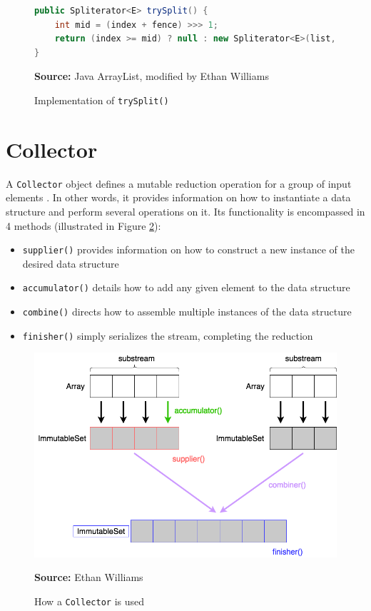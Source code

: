 \documentclass[oneside, 12pt]{article}
\newcommand{\source}[1]{\textbf{Source:} {#1} }
\begin{document}
\begin{figure}[H]
\centering
\begin{lstlisting}[language=Java]
public Spliterator<E> trySplit() {
    int mid = (index + fence) >>> 1;
    return (index >= mid) ? null : new Spliterator<E>(list, index, index = mid);
}
\end{lstlisting}
\caption{Implementation of {\tt trySplit()}}
\source{Java ArrayList, modified by Ethan Williams}
\label{fig:trySplit}
\end{figure}

\section{Collector}
A \verb|Collector| object defines a mutable reduction operation for a group of input elements \autocite{collector_doc}. In other words, it provides information on how to instantiate a data structure and perform several operations on it. Its functionality is encompassed in 4 methods (illustrated in Figure \ref{fig:collector}):

\begin{itemize}
\item \verb|supplier()| provides information on how to construct a new instance of the desired data structure
\item \verb|accumulator()| details how to add any given element to the data structure
\item \verb|combine()| directs how to assemble multiple instances of the data structure
\item \verb|finisher()|  simply serializes the stream, completing the reduction
\end{itemize}

\begin{figure}[H]
\centering
\includegraphics[width=13cm]{../images/collector.png}
\caption{How a {\tt Collector} is used}
\source{Ethan Williams}
\label{fig:collector}
\end{figure}
\end{document}
